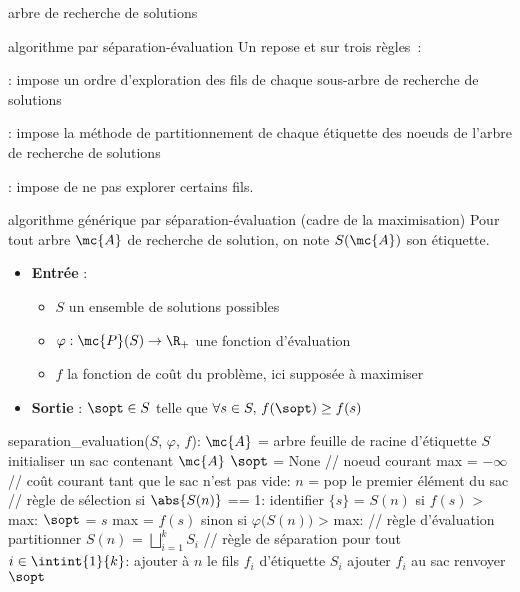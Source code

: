 \begin{adjustwidth}{-3cm}{-3cm}
\begin{definition}{6.10}{arbre de recherche de solutions}
\end{definition}

\begin{definition}{6.10}{algorithme par séparation-évaluation}
    Un  repose  et sur trois règles~:
    \begin{enumeratebf}
        \item {} : impose un ordre d'exploration des fils de chaque sous-arbre de recherche de solutions
        \item {} : impose la méthode de partitionnement de chaque étiquette des noeuds de l'arbre de recherche de solutions
        \item {} : impose de ne pas explorer certains fils.
    \end{enumeratebf}
\end{definition}

\begin{implementation}{algorithme générique par séparation-évaluation (cadre de la maximisation)}
    Pour tout arbre $\mc{A}$ de recherche de solution, on note $S(\mc{A})$ son étiquette.
    \begin{itemize}
        \item \textbf{Entrée} :
        \begin{itemize}
            \item $S$ un ensemble de solutions possibles
            \item $\varphi : \mc{P}(S) \to \R_+$ une fonction d'évaluation
            \item $f$ la fonction de coût du problème, ici supposée à maximiser
        \end{itemize}
        \item \textbf{Sortie} : $\sopt \in S$ telle que $\forall s \in S,\, f(\sopt) \geq f(s)$
    \end{itemize}
    \begin{lstLNat}
    separation_evaluation($S$, $\varphi$, $f$):
        $\mc{A}$ = arbre feuille de racine d'étiquette $S$
        initialiser un sac contenant $\mc{A}$
        $\sopt$ = None // noeud courant
        max = $-\infty$ // coût courant
        tant que le sac n'est pas vide:
            $n$ = pop le premier élément du sac // règle de sélection
            si $\abs{S(n)}$ == 1:
                identifier $\{s\}$ = $S(n)$
                si $f(s)$ > max:
                    $\sopt$ = $s$
                    max = $f(s)$
            sinon si $\varphi\big(S(n)\big)$ > max: // règle d'évaluation
                partitionner $S(n)$ = $\bigsqcup_{i=1}^{k}S_i$ // règle de séparation
                pour tout $i \in \intint{1}{k}$:
                    ajouter à $n$ le fils $f_i$ d'étiquette $S_i$
                    ajouter $f_i$ au sac
        renvoyer $\sopt$


\end{lstLNat}
\end{implementation}
\end{adjustwidth}

